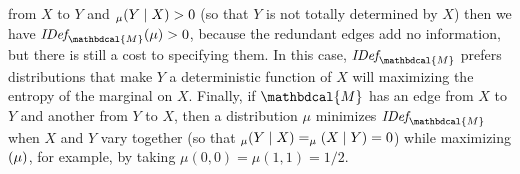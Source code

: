 \documentclass[letterpaper]{article} %
\theoremstyle{plain}
\newtheorem{prop}[theorem]{Proposition}
\theoremstyle{definition}
\theoremstyle{remark}
\let\H\relax
\DeclareMathOperator{\H}{\mathrm{H}} %
\DeclareMathOperator{\I}{\mathrm{I}} %
\newcommand{\CI}{\mathrel{\perp\mspace{-10mu}\perp}} %
\newcommand\mat[1]{\mathbf{#1}}
\newcommand{\N}{\mathcal N}
\newcommand{\dg}[1]{\mathbdcal{#1}}
\newcommand{\IDef}[1]{\mathit{IDef}_{\!#1}}
\begin{document}
 from $X$ to $Y$
 and $\H_{\mu}(Y \mid X) > 0$ 
(so that $Y$ is not totally determined by $X$)
then we have $\IDef{\dg M}(\mu) > 0$, because the redundant edges add no
information, but there is still a cost to specifying them.
In this case, $\IDef{\dg M}$ prefers distributions that make $Y$ a
deterministic function of $X$ will maximizing the entropy of the
marginal on $X$.
Finally, if ${\dg M}$ has an edge from $X$ to $Y$ and another from $Y$
to $X$, then a distribution $\mu$ minimizes $\IDef{\dg M}$ when 
$X$ and $Y$  vary together (so that $\H_\mu(Y \mid X) = \H_\mu(X \mid Y) = 0$)
while maximizing $\H(\mu)$, for example, by taking $\mu(0,0)
= \mu(1,1) = 1/2$. 

% 
% 
\end{document}
